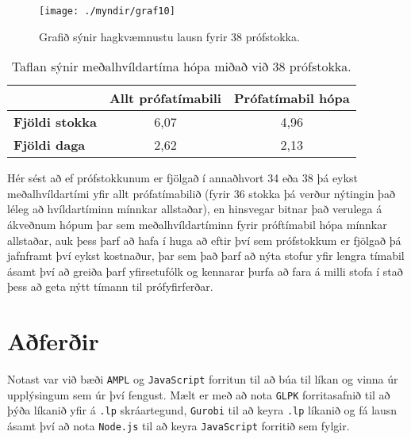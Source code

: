\documentclass[12pt]{article}
\begin{document}
\newpage

\begin{figure}[h]
    \centering
    \texttt{[image: ./myndir/graf10]}
    \caption{Grafið sýnir hagkvæmnustu lausn fyrir 38 prófstokka.}
\end{figure}

\begin{table}[h]
    \centering
    \begin{tabular}{l|c|c|}
        \cline{2-3}
        & \multicolumn{1}{l|}{\textbf{Allt prófatímabili}} & \multicolumn{1}{l|}{\textbf{Prófatímabil hópa}} \\ \hline
        \multicolumn{1}{|l|}{\textbf{Fjöldi stokka}} & 6,07                                             & 4,96                                            \\ \hline
        \multicolumn{1}{|l|}{\textbf{Fjöldi daga}}   & 2,62                                             & 2,13                                            \\ \hline
    \end{tabular}
    \caption{Taflan sýnir meðalhvíldartíma hópa miðað við 38 prófstokka.}
\end{table}


Hér sést að ef prófstokkunum er fjölgað í annaðhvort 34 eða 38 þá eykst meðalhvíldartími yfir allt prófatímabilið (fyrir 36 stokka þá verður nýtingin það léleg að hvíldartíminn mínnkar allstaðar), en hinsvegar bitnar það verulega á ákveðnum hópum þar sem meðalhvíldartíminn fyrir próftímabil hópa mínnkar allstaðar, auk þess þarf að hafa í huga að eftir því sem prófstokkum er fjölgað þá jafnframt því eykst kostnaður, þar sem það þarf að nýta stofur yfir lengra tímabil ásamt því að greiða þarf yfirsetufólk og kennarar þurfa að fara á milli stofa í stað þess að geta nýtt tímann til prófyfirferðar.
\newpage

\section{Aðferðir}

Notast var við bæði \texttt{AMPL} og \texttt{JavaScript} forritun til að búa til líkan og vinna úr upplýsingum sem úr því fengust. Mælt er með að nota \texttt{GLPK} forritasafnið til að þýða líkanið yfir á \texttt{.lp} skráartegund, \texttt{Gurobi} til að keyra \texttt{.lp} líkanið og fá lausn ásamt því að nota \texttt{Node.js} til að keyra \texttt{JavaScript} forritið sem fylgir.

\medskip
\end{document}
